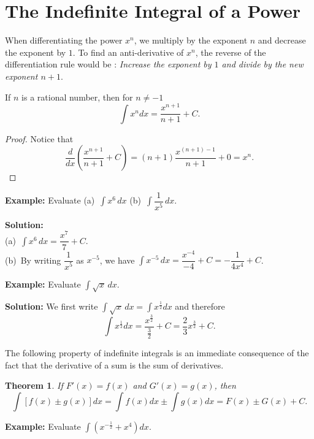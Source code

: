\documentclass[titlepage,a4paper,12pt]{report}
\newtheorem{theorem}{Theorem}[section]
\begin{document}
\section{The Indefinite Integral of a Power}
When differentiating the power $x^n$, we multiply by the exponent $n$ and decrease the exponent by $1$. To find an anti-derivative of $x^n$, the reverse of the differentiation rule would be : \textit{Increase the exponent by $1$ and divide by the new exponent $n+1$}.

\noindent If $n$ is a rational number, then for $n\neq -1$
\begin{equation*}
\int x^n dx =\dfrac{x^{n+1}}{n+1}+C.
\end{equation*}
\begin{proof}
Notice that 
\begin{equation*}
\dfrac{d}{dx}\left(\dfrac{x^{n+1}}{n+1}+C\right) =(n+1)\dfrac{x^{(n+1)-1}}{n+1}+0 =x^n.
\end{equation*}
\end{proof}
\noindent \textbf{Example:} Evaluate (a)\, $\displaystyle \int x^6\, dx$ \quad (b)\, $\displaystyle \int \dfrac{1}{x^5}\,  dx$.

\noindent \textbf{Solution:} \\
(a)\, $\displaystyle \int x^6 \, dx =\dfrac{x^7}{7} +C$.\\
(b)\, By writing $\dfrac{1}{x^5}$ as $x^{-5}$, we have $\displaystyle \int x^{-5}\, dx=\dfrac{x^{-4}}{-4}+C =-\dfrac{1}{4x^4}+C$.

\noindent \textbf{Example:} Evaluate $\displaystyle \int \sqrt{x}\,  dx$.

\noindent \textbf{Solution:} We first write $\displaystyle \int \sqrt{x}\, dx =\int x^{\frac{1}{2}}dx$ and therefore 
\begin{equation*}
\int x^{\frac{1}{2}}dx =\dfrac{x^{\frac{3}{2}}}{\frac{3}{2}} +C=\frac{2}{3}x^{\frac{3}{2}} +C.
\end{equation*}

\noindent The following property of indefinite integrals is an immediate consequence of the fact that the derivative of a sum is the sum of derivatives.

\begin{theorem}
If $F'(x)=f(x)$ and $G'(x)=g(x)$, then 
\begin{equation*}
\int [f(x) \pm g(x)]dx=\int f(x)dx \pm \int g(x)dx =F(x) \pm G(x) +C.
\end{equation*}
\end{theorem}
\noindent \textbf{Example:} Evaluate $\displaystyle \int (x^{-\frac{1}{2}}+x^4)dx$.
\end{document}
